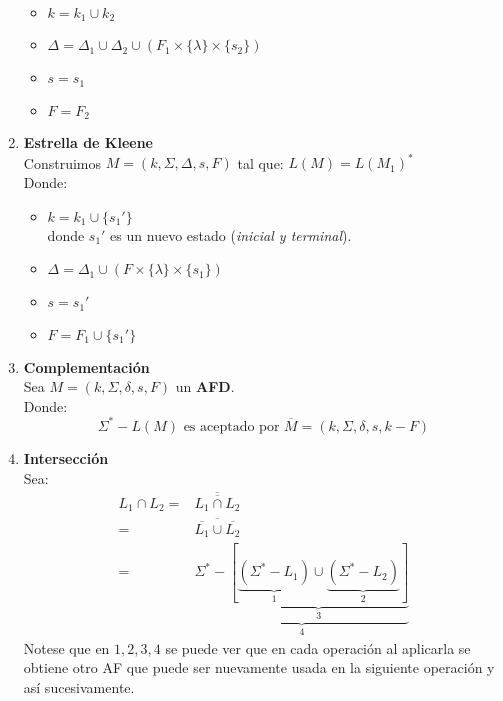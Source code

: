 \begin{enumerate}[label=\textbf{\alph*)}]
\begin{itemize}
\item $k=k_1 \cup k_2$ 
\item $\Delta=\Delta_1 \cup \Delta_2 \cup (F_1\times\{ \lambda \}\times \{ s_2\})$
\item $s=s_1$
\item $F=F_2$
\end{itemize}
\item \textbf{Estrella de Kleene} \\ ${ }$\\
Construimos $M=(k,\Sigma,\Delta,s,F)$ tal que: $L(M)=L(M_1)^* $\\
Donde:
\begin{itemize}
\item $k=k_1 \cup \{ s_1' \}$ \\
donde $s_1'$ es un nuevo estado (\textit{inicial y terminal}).
\item $\Delta=\Delta_1 \cup (F \times\{ \lambda \}\times \{ s_1\})$
\item $s=s_1'$
\item $F=F_1\cup\{ s_1' \}$
\end{itemize}
\item \textbf{Complementación} \\ ${ }$\\
Sea $M=(k,\Sigma,\delta,s,F)$ un \textbf{AFD}. \\
Donde:
$$
\Sigma^* - L(M) \text{ es aceptado por } \overline{M}=(k,\Sigma,\delta,s,k-F)
$$
\item \textbf{Intersección} \\ ${ }$\\
Sea:
\begin{align*}
L_1 \cap L_2 =& \overline{\overline{L_1 \cap L_2}} \\
		 =& \overline{\overline{L_1}\cup\overline{L_2}} \\
		 =& \underbrace{\Sigma^* - \underbrace{[ \underbrace{(\Sigma^* - L_1)}_{1}\cup \underbrace{(\Sigma^* -L_2)}_{2} ]}_{3}}_{4}
\end{align*}
Notese que en $1,2,3,4$ se puede ver que en cada operación al aplicarla se obtiene otro AF que puede ser nuevamente usada en la siguiente operación y así sucesivamente.
\end{enumerate}